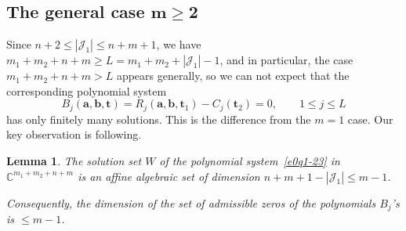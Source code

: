 \documentclass[pdftex]{sigma}
\numberwithin{equation}{section}
\newtheorem{Lemma}[Theorem]{Lemma}
\def\C{\mathbb C}
\begin{document}












%








\subsection[The general case m geq 2]{The general case $\boldsymbol{m\geq 2}$}


Since $n+2\leq |\mathcal{J}_1|\leq n+m+1$, we have $m_1+m_2+n+m\geq L=m_1+m_2+|\mathcal{J}_1|-1$, and in particular, the case $m_1+m_2+n+m>L$ appears generally, so we can not expect that the corresponding polynomial system
\begin{equation}
\label{e0q1-23}
B_j(\boldsymbol a,\boldsymbol b,\boldsymbol t)=R_j(
\boldsymbol a,\boldsymbol b,\boldsymbol t_1)-C_j(\boldsymbol t_2)=0,
\qquad 1\leq j\leq L
\end{equation}
has only finitely many solutions. This is the difference from the $m=1$ case.
Our key observation is following.

\begin{Lemma}\label{00lemm3-4}
The solution set $W$ of the polynomial system~\eqref{e0q1-23}
 in $\C^{m_1+m_2+n+m}$ is an affine algebraic set of dimension
 $n+m+1-|\mathcal{J}_1|\leq m-1$.

 Consequently, the dimension of the set of admissible zeros of the
 polynomials $B_j$'s is $\leq m-1$.
\end{Lemma}
\end{document}
